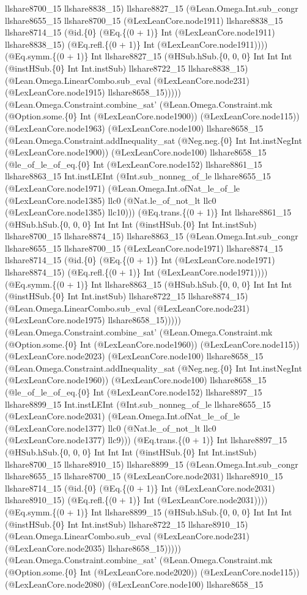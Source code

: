 \documentclass[11pt]{article}
\begin{document}
llshare8700\_15 llshare8838\_15) llshare8827\_15 (@Lean.Omega.Int.sub\_congr llshare8655\_15 llshare8700\_15 (@LexLeanCore.node1911) llshare8838\_15 llshare8714\_15 (@id.\{0\} (@Eq.\{(0 + 1)\} Int (@LexLeanCore.node1911) llshare8838\_15) (@Eq.refl.\{(0 + 1)\} Int (@LexLeanCore.node1911)))) (@Eq.symm.\{(0 + 1)\} Int llshare8827\_15 (@HSub.hSub.\{0, 0, 0\} Int Int Int (@instHSub.\{0\} Int Int.instSub) llshare8722\_15 llshare8838\_15) (@Lean.Omega.LinearCombo.sub\_eval (@LexLeanCore.node231) (@LexLeanCore.node1915) llshare8658\_15))))) (@Lean.Omega.Constraint.combine\_sat' (@Lean.Omega.Constraint.mk (@Option.some.\{0\} Int (@LexLeanCore.node1900)) (@LexLeanCore.node115)) (@LexLeanCore.node1963) (@LexLeanCore.node100) llshare8658\_15 (@Lean.Omega.Constraint.addInequality\_sat (@Neg.neg.\{0\} Int Int.instNegInt (@LexLeanCore.node1900)) (@LexLeanCore.node100) llshare8658\_15 (@le\_of\_le\_of\_eq.\{0\} Int (@LexLeanCore.node152) llshare8861\_15 llshare8863\_15 Int.instLEInt (@Int.sub\_nonneg\_of\_le llshare8655\_15 (@LexLeanCore.node1971) (@Lean.Omega.Int.ofNat\_le\_of\_le (@LexLeanCore.node1385) llc0 (@Nat.le\_of\_not\_lt llc0 (@LexLeanCore.node1385) llc10))) (@Eq.trans.\{(0 + 1)\} Int llshare8861\_15 (@HSub.hSub.\{0, 0, 0\} Int Int Int (@instHSub.\{0\} Int Int.instSub) llshare8700\_15 llshare8874\_15) llshare8863\_15 (@Lean.Omega.Int.sub\_congr llshare8655\_15 llshare8700\_15 (@LexLeanCore.node1971) llshare8874\_15 llshare8714\_15 (@id.\{0\} (@Eq.\{(0 + 1)\} Int (@LexLeanCore.node1971) llshare8874\_15) (@Eq.refl.\{(0 + 1)\} Int (@LexLeanCore.node1971)))) (@Eq.symm.\{(0 + 1)\} Int llshare8863\_15 (@HSub.hSub.\{0, 0, 0\} Int Int Int (@instHSub.\{0\} Int Int.instSub) llshare8722\_15 llshare8874\_15) (@Lean.Omega.LinearCombo.sub\_eval (@LexLeanCore.node231) (@LexLeanCore.node1975) llshare8658\_15))))) (@Lean.Omega.Constraint.combine\_sat' (@Lean.Omega.Constraint.mk (@Option.some.\{0\} Int (@LexLeanCore.node1960)) (@LexLeanCore.node115)) (@LexLeanCore.node2023) (@LexLeanCore.node100) llshare8658\_15 (@Lean.Omega.Constraint.addInequality\_sat (@Neg.neg.\{0\} Int Int.instNegInt (@LexLeanCore.node1960)) (@LexLeanCore.node100) llshare8658\_15 (@le\_of\_le\_of\_eq.\{0\} Int (@LexLeanCore.node152) llshare8897\_15 llshare8899\_15 Int.instLEInt (@Int.sub\_nonneg\_of\_le llshare8655\_15 (@LexLeanCore.node2031) (@Lean.Omega.Int.ofNat\_le\_of\_le (@LexLeanCore.node1377) llc0 (@Nat.le\_of\_not\_lt llc0 (@LexLeanCore.node1377) llc9))) (@Eq.trans.\{(0 + 1)\} Int llshare8897\_15 (@HSub.hSub.\{0, 0, 0\} Int Int Int (@instHSub.\{0\} Int Int.instSub) llshare8700\_15 llshare8910\_15) llshare8899\_15 (@Lean.Omega.Int.sub\_congr llshare8655\_15 llshare8700\_15 (@LexLeanCore.node2031) llshare8910\_15 llshare8714\_15 (@id.\{0\} (@Eq.\{(0 + 1)\} Int (@LexLeanCore.node2031) llshare8910\_15) (@Eq.refl.\{(0 + 1)\} Int (@LexLeanCore.node2031)))) (@Eq.symm.\{(0 + 1)\} Int llshare8899\_15 (@HSub.hSub.\{0, 0, 0\} Int Int Int (@instHSub.\{0\} Int Int.instSub) llshare8722\_15 llshare8910\_15) (@Lean.Omega.LinearCombo.sub\_eval (@LexLeanCore.node231) (@LexLeanCore.node2035) llshare8658\_15))))) (@Lean.Omega.Constraint.combine\_sat' (@Lean.Omega.Constraint.mk (@Option.some.\{0\} Int (@LexLeanCore.node2020)) (@LexLeanCore.node115)) (@LexLeanCore.node2080) (@LexLeanCore.node100) llshare8658\_15 
\end{document}
